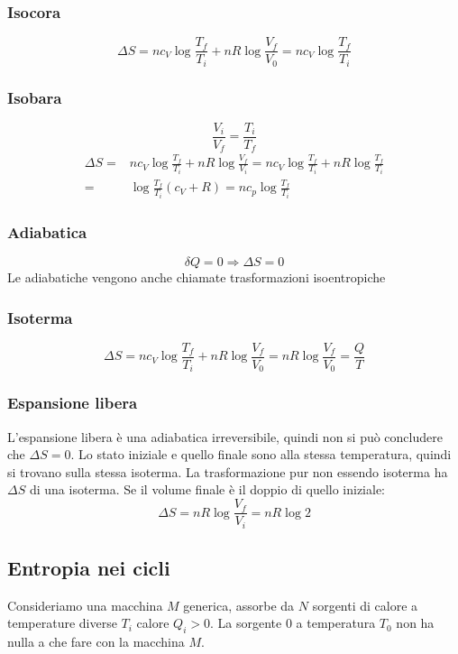 \subsubsection{Isocora}
\[\Delta S=nc_V\log\frac{T_f}{T_i}+nR\log\frac{V_f}{V_0}=nc_V\log\frac{T_f}{T_i}\]
\subsubsection{Isobara}
\[\frac{V_i}{V_f}=\frac{T_i}{T_f}\]
\begin{align*}
\Delta S=&nc_V\log\frac{T_f}{T_i}+nR\log\frac{V_f}{V_i}=nc_V\log\frac{T_f}{T_i}+nR\log\frac{T_f}{T_i}\\
=&\log\frac{T_f}{T_i}(c_V+R)=nc_p\log\frac{T_f}{T_i}
\end{align*}
\subsubsection{Adiabatica}
\[\delta Q=0 \Rightarrow \Delta S=0\]
Le adiabatiche vengono anche chiamate trasformazioni isoentropiche
\subsubsection{Isoterma}
\[\Delta S=nc_V\log\frac{T_f}{T_i}+nR\log\frac{V_f}{V_0}=nR\log\frac{V_f}{V_0}=\frac{Q}{T}\]
\subsubsection{Espansione libera}
L'espansione libera è una adiabatica irreversibile, quindi non si può concludere che $\Delta S=0$. Lo stato iniziale e quello finale sono alla stessa temperatura, quindi si trovano sulla stessa isoterma. La trasformazione pur non essendo isoterma ha $\Delta S$ di una isoterma. Se il volume finale è il doppio di quello iniziale:
\[\Delta S=nR\log\frac{V_f}{V_i}=nR\log 2\]

\subsection{Entropia nei cicli}
Consideriamo una macchina $M$ generica, assorbe da $N$ sorgenti di calore a temperature diverse $T_i$ calore $Q_i>0$. La sorgente $0$ a temperatura $T_0$ non ha nulla a che fare con la macchina $M$.

